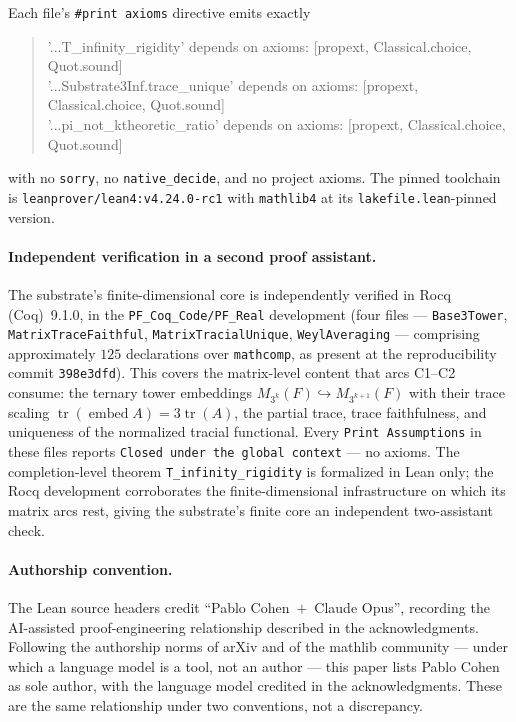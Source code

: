 \documentclass[11pt,a4paper]{article}
\theoremstyle{plain}
\theoremstyle{definition}
\begin{document}
\noindent
Each file's \texttt{\#print axioms} directive emits exactly
\begin{quote}\ttfamily\footnotesize
'...T\_infinity\_rigidity' depends on axioms: [propext, Classical.choice, Quot.sound]\\
'...Substrate3Inf.trace\_unique' depends on axioms: [propext, Classical.choice, Quot.sound]\\
'...pi\_not\_ktheoretic\_ratio' depends on axioms: [propext, Classical.choice, Quot.sound]
\end{quote}
with no \texttt{sorry}, no \texttt{native\_decide}, and no project axioms. The pinned toolchain is \texttt{leanprover/lean4:v4.24.0-rc1} with \texttt{mathlib4} at its \texttt{lakefile.lean}-pinned version.

\paragraph{Independent verification in a second proof assistant.} The substrate's finite-dimensional core is independently verified in Rocq (Coq)~9.1.0, in the \texttt{PF\_Coq\_Code/PF\_Real} development (four files --- \texttt{Base3Tower}, \texttt{MatrixTraceFaithful}, \texttt{MatrixTracialUnique}, \texttt{WeylAveraging} --- comprising approximately $125$ declarations over \texttt{mathcomp}, as present at the reproducibility commit \texttt{398e3dfd}). This covers the matrix-level content that arcs C1--C2 consume: the ternary tower embeddings $M_{3^k}(F) \hookrightarrow M_{3^{k+1}}(F)$ with their trace scaling $\operatorname{tr}(\operatorname{embed} A) = 3\operatorname{tr}(A)$, the partial trace, trace faithfulness, and uniqueness of the normalized tracial functional. Every \texttt{Print Assumptions} in these files reports \texttt{Closed under the global context} --- no axioms. The completion-level theorem \texttt{T\_infinity\_rigidity} is formalized in Lean only; the Rocq development corroborates the finite-dimensional infrastructure on which its matrix arcs rest, giving the substrate's finite core an independent two-assistant check.

\paragraph{Authorship convention.} The Lean source headers credit ``Pablo Cohen~$+$~Claude Opus'', recording the AI-assisted proof-engineering relationship described in the acknowledgments. Following the authorship norms of arXiv and of the mathlib community --- under which a language model is a tool, not an author --- this paper lists Pablo Cohen as sole author, with the language model credited in the acknowledgments. These are the same relationship under two conventions, not a discrepancy.
\end{document}
